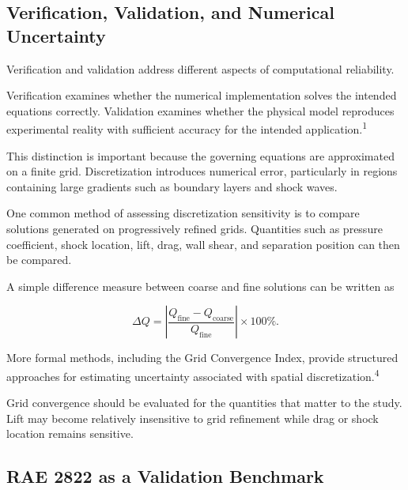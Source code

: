\documentclass[10pt]{article}
\newcommand{\supercite}[1]{\textsuperscript{#1}}
\begin{document}

\subsection{Verification, Validation, and Numerical Uncertainty}

Verification and validation address different aspects of computational
reliability.

Verification examines whether the numerical implementation solves the
intended equations correctly. Validation examines whether the physical
model reproduces experimental reality with sufficient accuracy for the
intended application.\supercite{1}

This distinction is important because the governing equations are
approximated on a finite grid. Discretization introduces numerical
error, particularly in regions containing large gradients such as
boundary layers and shock waves.

One common method of assessing discretization sensitivity is to compare
solutions generated on progressively refined grids. Quantities such as
pressure coefficient, shock location, lift, drag, wall shear, and
separation position can then be compared.

A simple difference measure between coarse and fine solutions can be
written as

\begin{equation}
\Delta Q =
\left|
\frac{Q_{\mathrm{fine}}-Q_{\mathrm{coarse}}}
{Q_{\mathrm{fine}}}
\right|\times100\%.
\end{equation}

More formal methods, including the Grid Convergence Index, provide
structured approaches for estimating uncertainty associated with
spatial discretization.\supercite{4}

Grid convergence should be evaluated for the quantities that matter to
the study. Lift may become relatively insensitive to grid refinement
while drag or shock location remains sensitive.


\subsection{RAE 2822 as a Validation Benchmark}
\end{document}
